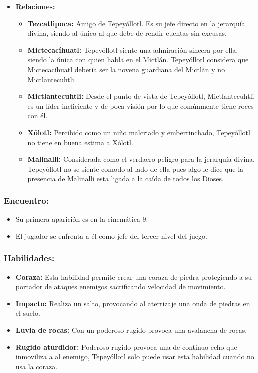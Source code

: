 \documentclass[11pt,letterpaper]{article}
\begin{document}
\begin{itemize}
	\item \textbf{Relaciones:}
	\begin{itemize}
		\item \textbf{Tezcatlipoca:} Amigo de Tepeyóllotl. Es su jefe directo en la jerarquía divina, siendo al único al que debe de rendir cuentas sin excusas. 
		\item \textbf{Mictecacíhuatl:} Tepeyóllotl siente una admiración sincera por ella, siendo la única con quien habla en el Mictlán. Tepeyóllotl considera que  Mictecacíhuatl debería ser la novena guardiana del  Mictlán y no Mictlantecuhtli.
		\item \textbf{Mictlantecuhtli:} Desde el punto de vista de Tepeyóllotl,  Mictlantecuhtli es un líder ineficiente y de poca visión por lo que comúnmente tiene roces con él.
		\item \textbf{Xólotl:} Percibido como un niño malcriado y emberrinchado, Tepeyóllotl no tiene en buena estima a Xólotl.
		\item \textbf{Malinalli:} Considerada como el verdaero peligro para la jerarquía divina. Tepeyóllotl no se siente comodo al lado de ella pues algo le dice que la presencia de Malinalli esta ligada a la caída de todos los Dioses.
	\end{itemize}                     
\end{itemize}
\subsubsection{Encuentro:}
\begin{itemize}
	\item Su primera aparición es en la cinemática 9. 
	\item El jugador se enfrenta a él como jefe del tercer nivel del juego.
\end{itemize}

\subsubsection{Habilidades:}
\begin{itemize}

        \item \textbf{Coraza:} Esta habilidad permite crear una coraza de piedra protegiendo a su portador de ataques enemigos sacrificando velocidad de movimiento.   
        \item \textbf{Impacto:} Realiza un salto, provocando al aterrizaje una onda de piedras en el suelo.
        \item \textbf{Luvia de rocas:} Con un poderoso rugido provoca una avalancha de rocas. 
	  \item \textbf{Rugido aturdidor:} Poderoso rugido provoca una de continuo echo que inmoviliza a al enemigo, Tepeyóllotl solo puede usar esta habilidad cuando no usa la coraza. 
\end{itemize}
\end{document}
